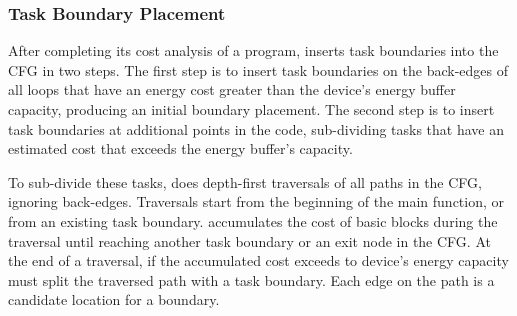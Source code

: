 

\subsubsection{Task Boundary Placement}

After completing its cost analysis of a program, \sys inserts task boundaries
into the CFG in two steps.  The first step is to insert task boundaries on the
back-edges of all loops that have an energy cost greater than the device's
energy buffer capacity, producing an initial boundary placement. The second
step is to insert task boundaries at additional points in the code,
sub-dividing tasks that have an estimated cost that exceeds the energy buffer's
capacity.

To sub-divide these tasks, \sys does depth-first traversals of all paths in the
CFG, ignoring back-edges. Traversals start from the beginning of the main
function, or from an existing task boundary.  \sys accumulates the cost of
basic blocks during the traversal until reaching another task boundary or an
exit node in the CFG.   At the end of a traversal, if the accumulated cost
exceeds to device's energy capacity \sys must split the traversed path with a
task boundary.  Each edge on the path is a candidate location for a boundary.

